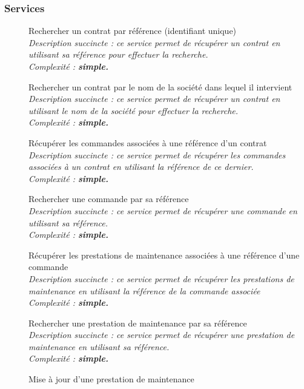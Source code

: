 \subsubsection{Services}

\begin{description}
    \item[\textbullet] Rechercher un contrat par référence (identifiant unique) \\
        \it{Description succincte :} ce service permet de récupérer un contrat en utilisant sa référence pour effectuer la recherche. \\
        \it{Complexité :} \bf{simple}.
    \item[\textbullet] Rechercher un contrat par le nom de la société dans lequel il intervient \\
        \it{Description succincte :} ce service permet de récupérer un contrat en utilisant le nom de la société pour effectuer la recherche. \\
        \it{Complexité :} \bf{simple}.
    \item[\textbullet] Récupérer les commandes associées à une référence d’un contrat  \\
        \it{Description succincte :} ce service permet de récupérer les commandes associées à un contrat en utilisant la référence de ce dernier. \\
        \it{Complexité :} \bf{simple}.
    \item[\textbullet] Rechercher une commande par sa référence \\
        \it{Description succincte :} ce service permet de récupérer une commande en utilisant sa référence. \\
        \it{Complexité :} \bf{simple}.
    \item[\textbullet] Récupérer les prestations de maintenance associées à une référence d’une commande \\
        \it{Description succincte :} ce service permet de récupérer les prestations de maintenance en utilisant la référence de la commande associée  \\
        \it{Complexité :} \bf{simple}. 
    \item[\textbullet] Rechercher une prestation de maintenance par sa référence \\
        \it{Description succincte :} ce service permet de récupérer une prestation de maintenance en utilisant sa référence. \\
        \it{Complexité :} \bf{simple}.
    \item[\textbullet] Mise à jour d’une prestation de maintenance \\

\end{description}
